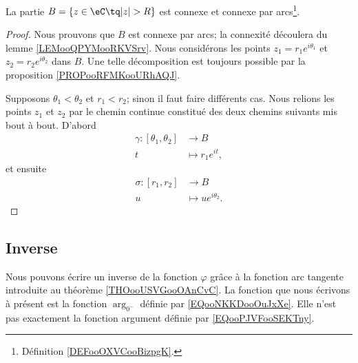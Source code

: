 \begin{corollary}		\label{CORooONAVooKPhQuI}
	La partie \( B=\{ z\in \eC\tq | z |>R \}\) est connexe et connexe par arcs\footnote{Définition \ref{DEFooOXVCooBizpgK}.}.
\end{corollary}

\begin{proof}
	Nous prouvons que \( B\) est connexe par arcs; la connexité découlera du lemme \ref{LEMooQPYMooRKVSrv}. Nous considérons les points \( z_1=r_1e^{i\theta_1}\) et \( z_2=r_2e^{i\theta_2}\) dans \( B\). Une telle décomposition est toujours possible par la proposition \ref{PROPooRFMKooURhAQJ}.

	Supposons \( \theta_1<\theta_2\) et \( r_1<r_2\); sinon il faut faire différents cas. Nous relions les points \( z_1\) et \( z_2\) par le chemin continue constitué des deux chemins suivants mis bout à bout. D'abord
	\begin{equation}
		\begin{aligned}
			\gamma\colon [\theta_1 ,\theta_2] & \to B              \\
			t                                 & \mapsto r_1e^{it},
		\end{aligned}
	\end{equation}
	et ensuite
	\begin{equation}
		\begin{aligned}
			\sigma\colon [r_1 ,r_2] & \to B                      \\
			u                       & \mapsto    ue^{i\theta_2}.
		\end{aligned}
	\end{equation}
\end{proof}

\subsection{Inverse}
\label{SUBSECooWFNMooOuZBRN}

Nous pouvons écrire un inverse de la fonction \( \varphi\) grâce à la fonction arc tangente introduite au théorème \ref{THOooUSVGooOAnCvC}.
La fonction que nous écrivons à présent est la fonction \( \arg_{0^{-}} \) définie par \eqref{EQooNKKDooOuJxXe}. Elle n'est pas exactement la fonction argument définie par \eqref{EQooPJVFooSEKTny}.

